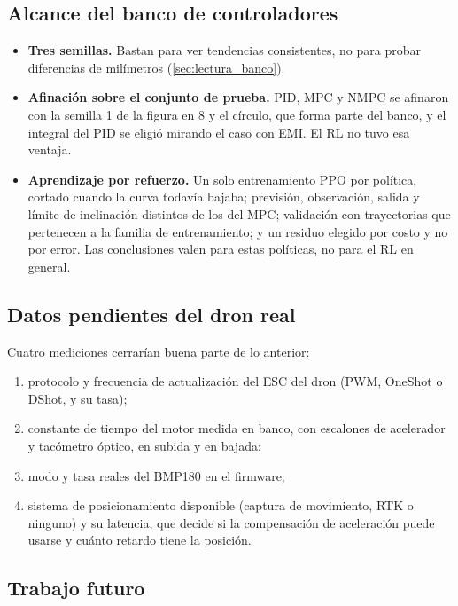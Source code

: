 \subsection{Alcance del banco de controladores}

\begin{itemize}
\item \textbf{Tres semillas.} Bastan para ver tendencias consistentes, no
para probar diferencias de milímetros (\cref{sec:lectura_banco}).
\item \textbf{Afinación sobre el conjunto de prueba.} PID, MPC y NMPC se
afinaron con la semilla 1 de la figura en 8 y el círculo, que forma parte
del banco, y el integral del PID se eligió mirando el caso con EMI. El RL no
tuvo esa ventaja.
\item \textbf{Aprendizaje por refuerzo.} Un solo entrenamiento PPO por
política, cortado cuando la curva todavía bajaba; previsión, observación,
salida y límite de inclinación distintos de los del MPC; validación con
trayectorias que pertenecen a la familia de entrenamiento; y un residuo
elegido por costo y no por error. Las conclusiones valen para estas
políticas, no para el RL en general.
\end{itemize}

\subsection{Datos pendientes del dron real}

Cuatro mediciones cerrarían buena parte de lo anterior:
\begin{enumerate}
\item protocolo y frecuencia de actualización del ESC del dron (PWM,
OneShot o DShot, y su tasa);
\item constante de tiempo del motor medida en banco, con escalones de
acelerador y tacómetro óptico, en subida y en bajada;
\item modo y tasa reales del BMP180 en el firmware;
\item sistema de posicionamiento disponible (captura de movimiento, RTK o
ninguno) y su latencia, que decide si la compensación de aceleración puede
usarse y cuánto retardo tiene la posición.
\end{enumerate}

\subsection{Trabajo futuro}

